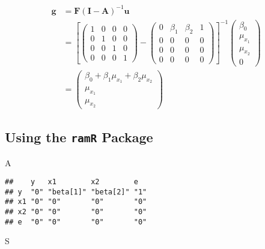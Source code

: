 \documentclass[
]{book}
\newenvironment{Shaded}{\begin{snugshade}}{\end{snugshade}}
\newcommand{\NormalTok}[1]{#1}
\theoremstyle{definition}
\theoremstyle{definition}
\theoremstyle{definition}
\theoremstyle{remark}
\begin{document}
\begin{align*}\mathbf{g} &=\mathbf{F} \left( \mathbf{I} - \mathbf{A} \right)^{-1} \mathbf{u}\\ &=\left[\left( \begin{array}{cccc} 1 & 0 & 0 & 0 \\ 0 & 1 & 0 & 0 \\ 0 & 0 & 1 & 0 \\ 0 & 0 & 0 & 1 \end{array} \right)-\left( \begin{array}{cccc} 0 & \beta  _{1} & \beta  _{2} & 1 \\ 0 & 0 & 0 & 0 \\ 0 & 0 & 0 & 0 \\ 0 & 0 & 0 & 0 \end{array} \right)\right]^{-1}\left( \begin{array}{c} \beta  _{0} \\ \mu  _{x_{1}} \\ \mu  _{x_{2}} \\ 0 \end{array} \right)\\ &=\left( \begin{array}{c} \beta  _{0} + \beta  _{1} \mu  _{x_{1}} + \beta  _{2} \mu  _{x_{2}} \\ \mu  _{x_{1}} \\ \mu  _{x_{2}} \end{array} \right)\end{align*}

\hypertarget{using-the-ramr-package-2}{%
\subsection{\texorpdfstring{Using the \texttt{ramR} Package}{Using the ramR Package}}\label{using-the-ramr-package-2}}

\begin{Shaded}
\begin{Highlighting}[]
\NormalTok{A}
\end{Highlighting}
\end{Shaded}

\begin{verbatim}
##    y   x1        x2        e  
## y  "0" "beta[1]" "beta[2]" "1"
## x1 "0" "0"       "0"       "0"
## x2 "0" "0"       "0"       "0"
## e  "0" "0"       "0"       "0"
\end{verbatim}

\begin{Shaded}
\begin{Highlighting}[]
\NormalTok{S}
\end{Highlighting}
\end{Shaded}
\end{document}
